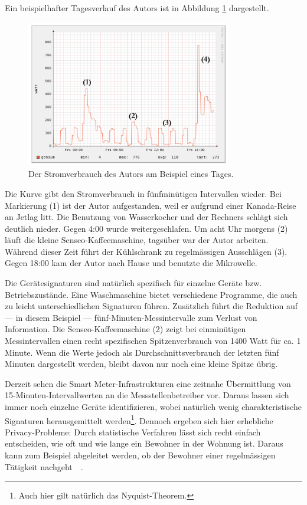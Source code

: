 \documentclass[12pt,BCOR=8.5mm]{scrartcl}
\newcommand*\imgwidth{0.8\textwidth}
\begin{document}
Ein beispielhafter Tagesverlauf des Autors ist in Abbildung
\ref{fig:schlaflos} dargestellt.
\begin{figure}[htbp]
  \begin{center}
    \includegraphics[width=\imgwidth]{figures/lastkurve-md-annotated.png}
    \caption{Der Stromverbrauch des Autors am Beispiel eines Tages.}
    \label{fig:schlaflos}
  \end{center}
\end{figure}
Die Kurve gibt den Stromverbrauch in fünfminütigen Intervallen
wieder. Bei Markierung (1) ist der Autor aufgestanden, weil er aufgrund
einer Kanada-Reise an Jetlag litt. Die Benutzung von Wasserkocher und
der Rechners schlägt sich deutlich nieder. Gegen 4:00 wurde
weitergeschlafen. Um acht Uhr morgens (2) läuft die kleine
Senseo-Kaffeemaschine, tagsüber war der Autor arbeiten. Während dieser
Zeit führt der Kühlschrank zu regelmässigen Ausschlägen (3). Gegen 18:00
kam der Autor nach Hause und benutzte die Mikrowelle.

Die Gerätesignaturen sind natürlich spezifisch für einzelne Geräte bzw.
Betriebszustände. Eine Waschmaschine bietet verschiedene Programme, die
auch zu leicht unterschiedlichen Signaturen führen. Zusätzlich führt die
Reduktion auf --- in diesem Beispiel --- fünf-Minuten-Messintervalle zum
Verlust von Information. Die Senseo-Kaffeemaschine (2) zeigt bei
einminütigen Messintervallen einen recht spezifischen Spitzenverbrauch
von 1400 Watt für ca. 1 Minute. Wenn die Werte jedoch als
Durchschnittsverbrauch der letzten fünf Minuten dargestellt werden,
bleibt davon nur noch eine kleine Spitze übrig.

Derzeit sehen die Smart Meter-Infrastrukturen eine zeitnahe Übermittlung
von 15-Minuten-Intervallwerten an die Messstellenbetreiber vor. Daraus
lassen sich immer noch einzelne Geräte identifizieren, wobei natürlich
wenig charakteristische Signaturen herausgemittelt
werden\footnote{Auch hier gilt natürlich das Nyquist-Theorem.}. Dennoch
ergeben sich hier erhebliche Privacy-Probleme: Durch statistische
Verfahren lässt sich recht einfach entscheiden, wie oft und wie lange
ein Bewohner in der Wohnung ist. Daraus kann zum Beispiel abgeleitet
werden, ob der Bewohner einer regelmässigen Tätigkeit
nachgeht~\cite{mueller10verhalten}~\cite{kurz10smartmeter}. 
\end{document}
